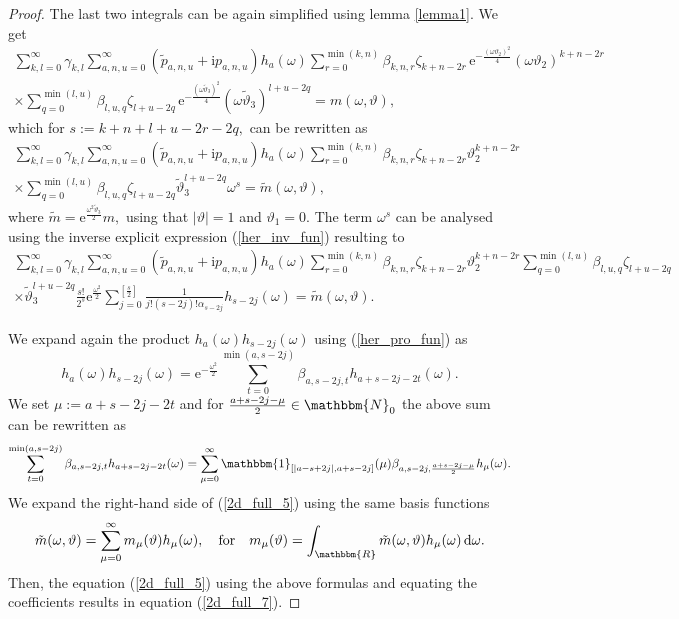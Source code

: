 \documentclass[a4paper,twoside,10pt]{article}
\theoremstyle{break}
\theoremstyle{nonumberplain}
\newtheorem{proof}{Proof}
\newcommand{\R}{\mathbbm{R}}
\newcommand{\N}{\mathbbm{N}}
\newcommand{\id}{\mathbbm{1}}
\newcommand{\e}{\mathrm e}
\renewcommand{\i}{\mathrm i}
\renewcommand{\d}{\,\mathrm d}
\begin{document}
\begin{proof}
The last two integrals can be again simplified using lemma \ref{lemma1}. We get
\begin{multline*}%
 \sum_{k,l=0}^\infty \gamma_{k,l} \sum_{a,n,u=0}^\infty (\tilde p_{a,n,u} +\i p_{a,n,u} ) h_a (\omega) \sum_{r=0}^{\min (k,n)} \beta_{k,n,r}
\zeta_{k+n-2r} \, \e^{-
\frac{(\omega \vartheta_2 )^2}4} (\omega \vartheta_2)^{k+n-2r}
\\
\times \sum_{q=0}^{\min (l,u)} \beta_{l,u,q} \zeta_{l+u-2q} \, \e^{-
\frac{(\omega \tilde\vartheta_3 )^2}4} (\omega \tilde\vartheta_3)^{l+u-2q}
  =  m ( \omega, \vartheta),
\end{multline*}
which for $s:= k+n+l+u-2r-2q,$ can be rewritten as
\begin{multline*}%
\sum_{k,l=0}^\infty \gamma_{k,l} \sum_{a,n,u=0}^\infty (\tilde p_{a,n,u} +\i p_{a,n,u} ) h_a (\omega) \sum_{r=0}^{\min (k,n)} \beta_{k,n,r}
\zeta_{k+n-2r}   \vartheta_2^{k+n-2r}
\\
\times \sum_{q=0}^{\min (l,u)} \beta_{l,u,q} \zeta_{l+u-2q}   \tilde\vartheta_3^{l+u-2q} \omega^s
  =  \tilde m ( \omega, \vartheta),
\end{multline*}
where $\tilde{m} = \e^{\frac{\omega^2 \tilde\vartheta_3 }2 } m,$ using that $|\vartheta |= 1$ and $\vartheta_1 = 0.$ The term $\omega^s$ can be analysed using the inverse explicit expression (\ref{her_inv_fun}) resulting to
\begin{eqnarray}\label{2d_full_5}
 \sum_{k,l=0}^\infty \gamma_{k,l} \sum_{a,n,u=0}^\infty (\tilde p_{a,n,u} +\i p_{a,n,u} ) h_a (\omega) \sum_{r=0}^{\min (k,n)} \beta_{k,n,r}
\zeta_{k+n-2r}   \vartheta_2^{k+n-2r}
\sum_{q=0}^{\min (l,u)} \beta_{l,u,q} \zeta_{l+u-2q}  \nonumber\\
\times \tilde\vartheta_3^{l+u-2q} \frac{s!}{2^s} \e^{\frac{\omega^2}2}\sum_{j=0}^{\left[ \frac{s}{2}\right] } \frac{1}{j!(s-2j)! \alpha_{s-2j}}  h_{s-2j} (\omega)
  =  \tilde m ( \omega, \vartheta).
\end{eqnarray}

We expand again the product $h_a (\omega)h_{s-2j}(\omega)$ using (\ref{her_pro_fun})  as
\[
h_a (\omega)h_{s-2j}(\omega) = \e^{-\frac{\omega^2}2}  \sum_{t=0}^{\min (a,s-2j)} 
\beta_{a,s-2j,t} h_{a+s-2j-2t} (\omega).
\]
We set $\mu:= a+s-2j-2t$ and for $\frac{a+s-2j-\mu}2 \in \N_0$ the above sum can be rewritten as
\[
 \sum_{t=0}^{\min (a,s-2j)} 
\beta_{a,s-2j,t} h_{a+s-2j-2t} (\omega) = \sum_{\mu=0}^\infty \id_{[\vert a-s+2j \vert,  a+s-2j]} (\mu)\beta_{a,s-2j,\frac{a+s-2j-\mu}2} h_\mu (\omega) .
\]
We expand the right-hand side of (\ref{2d_full_5}) using the same basis functions
\begin{equation*}%
\tilde m ( \omega, \vartheta) = \sum_{\mu=0}^\infty m_\mu (\vartheta) h_\mu (\omega), \quad \mbox{for} \quad m_\mu (\vartheta) = \int_\R \tilde m ( \omega, \vartheta) h_\mu(\omega) \d 
\omega  .
\end{equation*}
Then, the equation (\ref{2d_full_5}) using the above formulas and equating the coefficients results in equation (\ref{2d_full_7}).
\end{proof}
\end{document}
